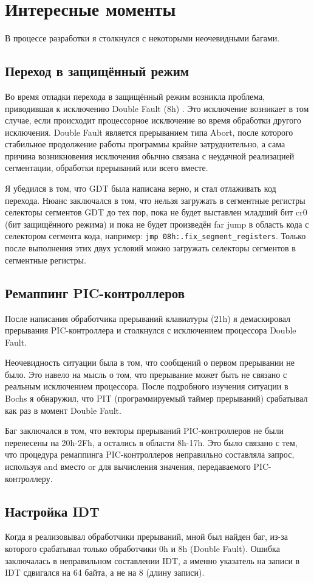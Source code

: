 \chapter{Интересные моменты}

В процессе разработки я столкнулся с некоторыми неочевидными багами.

\section{Переход в защищённый режим}

Во время отладки перехода в защищённый режим возникла проблема, приводившая к исключению Double Fault (8h) \cite{exceptions}. Это исключение возникает в том случае, если происходит процессорное исключение во время обработки другого исключения. Double Fault является прерыванием типа Abort, после которого стабильное продолжение работы программы крайне затруднительно, а сама причина возникновения исключения обычно связана с неудачной реализацией сегментации, обработки прерываний или всего вместе. 

Я убедился в том, что GDT была написана верно, и стал отлаживать код перехода. Нюанс заключался в том, что нельзя загружать в сегментные регистры селекторы сегментов GDT до тех пор, пока не будет выставлен младший бит cr0 (бит защищённого режима) и пока не будет произведён far jump в область кода с селектором сегмента кода, например: \verb|jmp 08h:.fix_segment_registers|. Только после выполнения этих двух условий можно загружать селекторы сегментов в сегментные регистры.

\section{Ремаппинг PIC-контроллеров}

После написания обработчика прерываний клавиатуры (21h) я демаскировал прерывания PIC-контроллера и столкнулся с исключением процессора Double Fault.

Неочевидность ситуации была в том, что сообщений о первом прерывании не было. Это навело на мысль о том, что прерывание может быть не связано с реальным исключением процессора. После подробного изучения ситуации в Bochs я обнаружил, что PIT (программируемый таймер прерываний) срабатывал как раз в момент Double Fault.

Баг заключался в том, что векторы прерываний PIC-контроллеров не были перенесены на 20h-2Fh, а остались в области 8h-17h. Это было связано с тем, что процедура ремаппинга PIC-контроллеров неправильно составляла запрос, используя and вместо or для вычисления значения, передаваемого PIC-контроллеру.

\section{Настройка IDT}

Когда я реализовывал обработчики прерываний, мной был найден баг, из-за которого срабатывал только обработчики 0h и 8h (Double Fault). Ошибка заключалась в неправильном составлении IDT, а именно указатель на записи в IDT сдвигался на 64 байта, а не на 8 (длину записи).